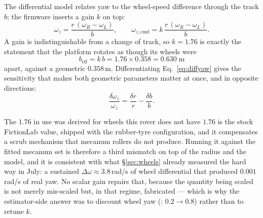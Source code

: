The differential model relates yaw to the wheel-speed difference through
the track $b$; the firmware inserts a gain $k$ on top:
\begin{equation}
\omega_z = \frac{r\,(\omega_R - \omega_L)}{b},
\qquad
\omega_{z,\mathrm{cmd}} = k\,\frac{r\,(\omega_R - \omega_L)}{b}.
\label{eq:diffyaw}
\end{equation}
A gain is indistinguishable from a change of track, so $k=1.76$ is exactly
the statement that the platform rotates as though its wheels were
\begin{equation}
b_{\mathrm{eff}} = k\,b = 1.76 \times 0.358 = 0.630\;\text{m}
\label{eq:beff}
\end{equation}
apart, against a geometric $0.358$\,m. Differentiating
Eq.~\ref{eq:diffyaw} gives the sensitivity that makes both geometric
parameters matter at once, and in opposite directions:
\begin{equation}
\frac{\delta\omega_z}{\omega_z}
  = \frac{\delta r}{r} - \frac{\delta b}{b}.
\label{eq:yawsens}
\end{equation}

\begin{trapbox}{The $1.76$ in use was derived for wheels this rover does not have}
$1.76$ is the stock FictionLab value, shipped with the rubber-tyre
configuration, and it compensates a scrub mechanism that mecanum rollers do
not produce. Running it against the fitted mecanum set is therefore a third
mismatch on top of the radius and the model, and it is consistent with what
\S\ref{sec:wheels} already measured the hard way in July: a sustained
$\Delta\omega \approx 3.8$\,rad/s of wheel differential that produced
$0.001$\,rad/s of real yaw. No scalar gain repairs that, because the
quantity being scaled is not merely mis-scaled but, in that regime,
fabricated --- which is why the estimator-side answer was to discount wheel
yaw (: $0.2 \rightarrow 0.8$) rather than to retune $k$.
\end{trapbox}

